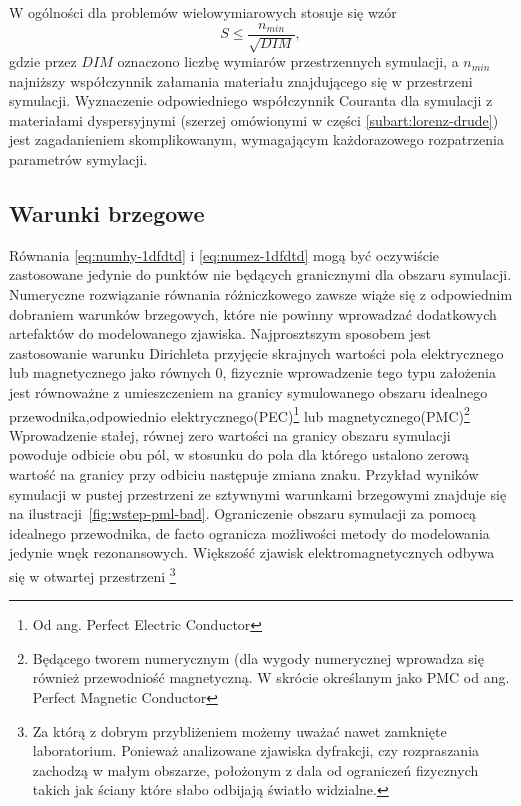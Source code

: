 W ogólności dla problemów wielowymiarowych stosuje się wzór
\begin{equation}
S\le\frac{n_{min}}{\sqrt{DIM}},
\label{eq:courant}
\end{equation}
gdzie przez $DIM$ oznaczono liczbę wymiarów przestrzennych symulacji, a $n_{min}$ najniższy współczynnik załamania materiału znajdującego się w przestrzeni symulacji. Wyznaczenie odpowiedniego współczynnik Couranta dla symulacji z materiałami dyspersyjnymi (szerzej omówionymi w części \ref{subart:lorenz-drude}) jest zagadanieniem skomplikowanym, wymagającym każdorazowego rozpatrzenia parametrów symylacji.

\subsection{Warunki brzegowe}
Równania \ref{eq:numhy-1dfdtd} i \ref{eq:numez-1dfdtd} mogą być oczywiście zastosowane jedynie do punktów nie będących granicznymi dla obszaru symulacji. Numeryczne rozwiązanie równania różniczkowego zawsze wiąże się z odpowiednim dobraniem warunków brzegowych, które nie powinny wprowadzać dodatkowych artefaktów do modelowanego zjawiska. Najprosztszym sposobem jest zastosowanie warunku Dirichleta przyjęcie skrajnych wartości pola elektrycznego lub magnetycznego jako równych 0, fizycznie wprowadzenie tego typu założenia jest równoważne z umieszczeniem na granicy symulowanego obszaru idealnego przewodnika,odpowiednio elektrycznego(PEC)\footnote{Od ang. Perfect Electric Conductor} lub magnetycznego(PMC)\footnote{Będącego tworem numerycznym (dla wygody numerycznej wprowadza się również przewodniość magnetyczną. W skrócie określanym jako PMC od ang. Perfect Magnetic Conductor} Wprowadzenie stałej, równej zero wartości na granicy obszaru symulacji powoduje odbicie obu pól, w stosunku do pola dla którego ustalono zerową wartość na granicy przy odbiciu następuje zmiana znaku. Przykład wyników symulacji w pustej przestrzeni ze sztywnymi warunkami brzegowymi znajduje się na ilustracji~\ref{fig:wstep-pml-bad}. Ograniczenie obszaru symulacji za pomocą idealnego przewodnika, de facto ogranicza możliwości metody do modelowania jedynie wnęk rezonansowych. Większość zjawisk elektromagnetycznych odbywa się w otwartej przestrzeni \footnote{Za którą z dobrym przybliżeniem możemy uważać nawet zamknięte laboratorium. Ponieważ analizowane zjawiska dyfrakcji, czy rozpraszania zachodzą w małym obszarze, położonym z dala od ograniczeń fizycznych takich jak ściany które słabo odbijają światło widzialne.}


